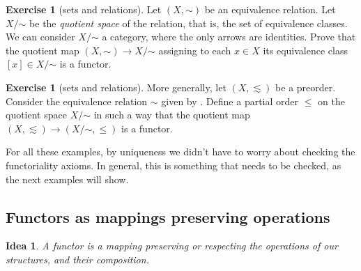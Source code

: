 \documentclass[12pt,oneside,headings=small]{scrbook}
\def\simord{\mathord\sim}
\numberwithin{equation}{section}
\theoremstyle{plain}
\newtheorem*{idea}{Idea}
\theoremstyle{definition}
\newtheorem{ex}[thm]{Exercise}
\DeclareMathOperator{\1}{\mathbbm{1}}
\DeclareMathOperator{\2}{\mathbbm{2}}
\begin{document}
\begin{ex}[sets and relations]\label{quotient}
 Let $(X,\simord)$ be an equivalence relation. Let $X/\simord$ be the \emph{quotient space} of the relation, that is, the set of equivalence classes. We can consider $X/\simord$ a category, where the only arrows are identities. Prove that the quotient map $(X,\simord)\to X/\simord$ assigning to each $x\in X$ its equivalence class $[x]\in X/\simord$ is a functor.
\end{ex}

\begin{ex}[sets and relations]
 More generally, let $(X,\lesssim)$ be a preorder. Consider the equivalence relation $\sim$ given by . Define a partial order $\le$ on the quotient space $X/\simord$ in such a way that the quotient map $(X,\lesssim)\to (X/\simord, \le)$ is a functor. 
\end{ex}

For all these examples, by uniqueness we didn't have to worry about checking the functoriality axioms. In general, this is something that needs to be checked, as the next examples will show.


\subsection{Functors as mappings preserving operations}

\begin{idea}
 A functor is a mapping preserving or respecting the operations of our structures, and their composition.
\end{idea}
\end{document}

